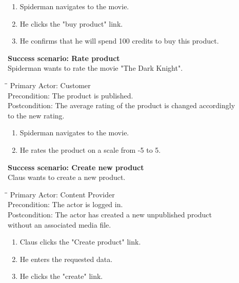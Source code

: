 \begin{enumerate} \setlength{\itemsep}{-1mm}
	\item Spiderman navigates to the movie.
	\item He clicks the "buy product" link.
	\item He confirms that he will spend 100 credits to buy this product. 
\end{enumerate}
\vspace{3mm}
\textbf{Success scenario: Rate product} \\
Spiderman wants to rate the movie "The Dark Knight". 
\begin{tabbing}
\hspace{5mm}\=\hspace{26mm}\=\kill
\>Primary Actor:\> Customer\\
\>Precondition:\> The product is published.\\
\>Postcondition:\> The average rating of the product is changed accordingly\\ \hspace{85px} to the new rating.
\end{tabbing}
\begin{enumerate} \setlength{\itemsep}{-1mm}
	\item Spiderman navigates to the movie.
	\item He rates the product on a scale from -5 to 5.
\end{enumerate}
\vspace{3mm}
\textbf{Success scenario: Create new product} \\
Claus wants to create a new product. 
\begin{tabbing}
\hspace{5mm}\=\hspace{26mm}\=\kill
\>Primary Actor:\> Content Provider\\
\>Precondition:\> The actor is logged in.\\
\>Postcondition:\> The actor has created a new unpublished product\\ \hspace{85px} without an associated media file.
\end{tabbing}
\begin{enumerate} \setlength{\itemsep}{-1mm}
	\item Claus clicks the "Create product" link.
	\item He enters the requested data.
	\item He clicks the "create" link.
\end{enumerate}
